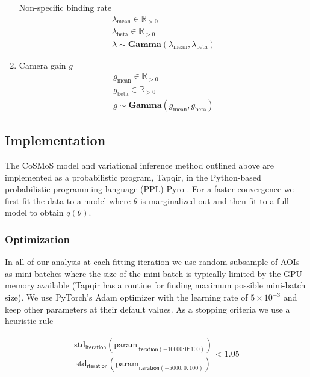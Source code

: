 \begin{enumerate}
    Non-specific binding rate
    \begin{gather*}
        \lambda_\mathrm{mean} \in \mathbb{R}_{>0} \\
        \lambda_\mathrm{beta} \in \mathbb{R}_{>0} \\
        \lambda \sim \mathbf{Gamma}(\lambda_\mathrm{mean}, \lambda_\mathrm{beta})
    \end{gather*}
    
    \item Camera gain $g$
    \begin{gather*}
        g_\mathrm{mean} \in \mathbb{R}_{>0} \\
        g_\mathrm{beta} \in \mathbb{R}_{>0} \\
        g \sim \mathbf{Gamma}(g_\mathrm{mean}, g_\mathrm{beta})
    \end{gather*}
\end{enumerate}

\subsection*{Implementation}

The CoSMoS model and variational inference method outlined above are implemented as a probabilistic program, Tapqir, in the Python-based probabilistic programming language (PPL) Pyro \cite{Bingham2019-qy,Obermeyer2019-xt}. For a faster convergence we first fit the data to a model where $\theta$ is marginalized out and then fit to a full model to obtain $q(\theta)$.

\subsubsection*{Optimization}

In all of our analysis at each fitting iteration we use random subsample of AOIs as mini-batches where the size of the mini-batch is typically limited by the GPU memory available (Tapqir has a routine for finding maximum possible mini-batch size). We use PyTorch's Adam optimizer with the learning rate of $5\times 10^{-3}$ and keep other parameters at their default values. As a stopping criteria we use a heuristic rule

\begin{gather*}
    \dfrac{\mathrm{std}_\mathsf{iteration}(\mathrm{param}_{\mathsf{iteration}(-10000:0:100)})}{\mathrm{std}_\mathsf{iteration}(\mathrm{param}_{\mathsf{iteration}(-5000:0:100)})} < 1.05
\end{gather*}

